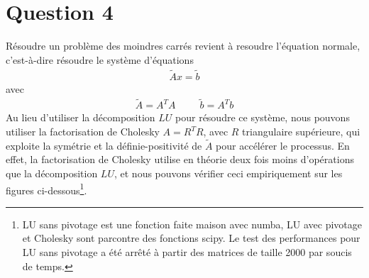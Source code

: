 \documentclass[11pt]{article}
\begin{document}
\section*{Question 4}
Résoudre un problème des moindres carrés revient à resoudre l'équation normale, c'est-à-dire résoudre le système d'équations
\begin{align}
    \tilde{A}x = \tilde{b}
\end{align}
avec
\begin{align}
    \tilde{A} = A^TA ~~~~~~~~~~~ \tilde{b} = A^Tb
\end{align}
Au lieu d'utiliser la décomposition $LU$ pour résoudre ce système, nous pouvons utiliser la factorisation de Cholesky $A = R^TR$, avec $R$ triangulaire supérieure, qui exploite la symétrie et la définie-positivité de $\tilde{A}$ pour accélérer le processus. En effet, la factorisation de Cholesky utilise en théorie deux fois moins d'opérations que la décomposition $LU$, et nous pouvons vérifier ceci empiriquement sur les figures ci-dessous\footnote{LU sans pivotage est une fonction faite maison avec numba, LU avec pivotage et Cholesky sont parcontre des fonctions scipy. Le test des performances pour LU sans pivotage a été arrêté à partir des matrices de taille 2000 par soucis de temps.}.
\begin{figure}[H]
    \centering
    
    
\end{figure}
\end{document}
